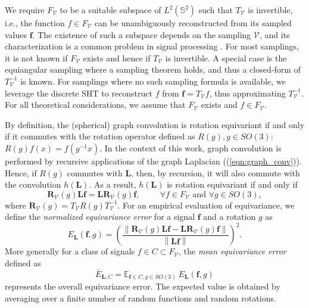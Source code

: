 \documentclass{article} %
\newcommand{\norm}[1]{\left\lVert#1\right\rVert}
\renewcommand{\b}[1]{{\bm{#1}}}  %
\renewcommand{\S}{\mathbb{S}}
\newcommand{\V}{\mathcal{V}}  %
\newcommand{\eqnref}[1]{(\ref{eqn:#1})}
\begin{document}
We require $F_\V$ to be a suitable subspace of $L^2(\S^2)$ such that $T_\V$ is invertible, i.e., the function $f \in F_\V$ can be unambiguously reconstructed from its sampled values $\b{f}$.
The existence of such a subspace depends on the sampling $\V$, and its characterization is a common problem in signal processing \citep{driscoll1994Fouriersphere}.
For most samplings, it is not known if $F_\V$ exists and hence if $T_\V$ is invertible.
A special case is the equiangular sampling where a sampling theorem holds, and thus a closed-form of $T_\V^{-1}$ is known. %
For samplings where no such sampling formula is available, we leverage the discrete SHT to reconstruct $f$ from $\b{f}=T_\V f$, thus approximating $T_\V^{-1}$.
For all theoretical considerations, we assume that $F_\V$ exists and $f \in F_\V$.

By definition, the (spherical) graph convolution is rotation equivariant if and only if it commutes with the rotation operator defined as $R(g), g\in SO(3)$: $R(g) f(x) = f\left(g^{-1} x \right)$.
In the context of this work, graph convolution is performed by recursive applications of the graph Laplacian (\eqnref{graph_conv}).
Hence, if $R(g)$ commutes with $\b{L}$, then, by recursion, it will also commute with the convolution $h(\b{L})$.
As a result, $h(\b{L})$ is rotation equivariant if and only if
\begin{equation*} %
	\b{R}_\V(g) \b{L} \b{f} = \b{L} \b{R}_\V(g) \b{f}, \hspace{1cm} \forall f\in F_\V \text{ and } \forall g\in SO(3),
\end{equation*}
where $\b{R}_\V(g) = T_\V R(g) T_\V^{-1}$.
For an empirical evaluation of equivariance, we define the \textit{normalized equivariance error} for a signal $\b{f}$ and a  rotation $g$ as
\begin{equation} \label{eq:equivariance error}
	E_{\b{L}}(\b{f}, g) = \left(\frac{ \norm {\b{R}_\V(g) \b{L} \b{f} - \b{L} \b{R}_\V(g) \b{f}} }{\norm {\b{L} \b{f}}}\right)^2.
\end{equation}
More generally for a class of signals $f \in C \subset F_\V$, the \textit{mean equivariance error} defined as
\begin{equation} \label{eq:mean equivariance error}
	\overline E_{\b{L}, C} = \mathbb E_{\b{f}\in C, g\in SO(3)} \ E_{\b{L}}(\b{f}, g)
\end{equation}
represents the overall equivariance error.
The expected value is obtained by averaging over a finite number of random functions and random rotations.
\end{document}

